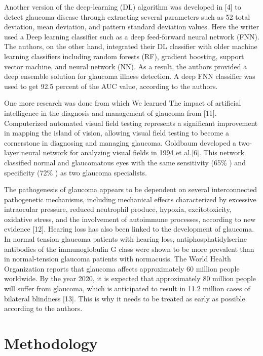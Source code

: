 \documentclass[conference]{IEEEtran}
\begin{document}
\noindent Another version of the deep-learning (DL) algorithm was developed in [4] to detect glaucoma disease through extracting several parameters such as 52 total deviation, mean deviation, and pattern standard deviation values. Here the writer used a Deep learning classifier such as a deep feed-forward neural network (FNN). The authors, on the other hand, integrated their DL classifier with older machine learning classifiers including random forests (RF), gradient boosting, support vector machine, and neural network (NN). As a result, the authors provided a deep ensemble solution for glaucoma illness detection. A deep FNN classifier was used to get 92.5 percent of the AUC value, according to the authors. 

\noindent One more research was done from which We learned The impact of artificial intelligence in the diagnosis and management of glaucoma from [11]. Computerized automated visual field testing represents a significant improvement in mapping the island of vision, allowing visual field testing to become a cornerstone in diagnosing and managing glaucoma. Goldbaum developed a two-layer neural network for analyzing visual fields in 1994 et al.[6]. This network classified normal and glaucomatous eyes with the same sensitivity (65\% ) and specificity (72\% ) as two glaucoma specialists. 

\noindent The pathogenesis of glaucoma appears to be dependent on several interconnected pathogenetic mechanisms, including mechanical effects characterized by excessive intraocular pressure, reduced neutrophil produce, hypoxia, excitotoxicity, oxidative stress, and the involvement of autoimmune processes, according to new evidence [12]. Hearing loss has also been linked to the development of glaucoma. In normal tension glaucoma patients with hearing loss, antiphosphatidylserine antibodies of the immunoglobulin G class were shown to be more prevalent than in normal-tension glaucoma patients with normacusis. The World Health Organization reports that glaucoma affects approximately 60 million people worldwide. By the year 2020, it is expected that approximately 80 million people will suffer from glaucoma, which is anticipated to result in 11.2 million cases of bilateral blindness [13]. This is why it needs to be treated as early as possible according to the authors. 

\section{Methodology}
\end{document}

